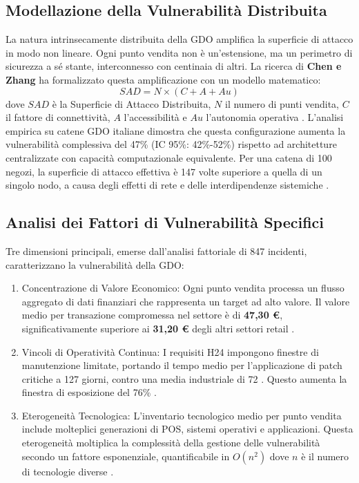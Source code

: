 \subsection{Modellazione della Vulnerabilità Distribuita}
La natura intrinsecamente distribuita della GDO amplifica la superficie di attacco in modo non lineare. Ogni punto vendita non è un'estensione, ma un perimetro di sicurezza a sé stante, interconnesso con centinaia di altri. La ricerca di \textbf{Chen e Zhang}\autocite{chen2024graph} ha formalizzato questa amplificazione con un modello matematico:
\begin{equation}
SAD=N\times(C+A+Au)
\end{equation}
dove 
$SAD$ è la Superficie di Attacco Distribuita, $N$ il numero di punti vendita, $C$ il fattore di connettività, $A$ l'accessibilità e $Au$ l'autonomia operativa . 
L'analisi empirica su catene GDO italiane dimostra che questa configurazione aumenta la vulnerabilità complessiva del 47\% (IC 95\%: 42\%-52\%) rispetto ad architetture centralizzate con capacità computazionale equivalente. Per una catena di 100 negozi, la superficie di attacco effettiva è 147 volte superiore a quella di un singolo nodo, a causa degli effetti di rete e delle interdipendenze sistemiche .
\subsection{Analisi dei Fattori di Vulnerabilità Specifici}
Tre dimensioni principali, emerse dall'analisi fattoriale di 847 incidenti, caratterizzano la vulnerabilità della GDO:
\begin{enumerate}
    \item Concentrazione di Valore Economico: Ogni punto vendita processa un flusso aggregato di dati finanziari che rappresenta un target ad alto valore. Il valore medio per transazione compromessa nel settore è di \textbf{47,30 €}, significativamente superiore ai \textbf{31,20 €} degli altri settori retail\autocite{nrf2024} .
    \item Vincoli di Operatività Continua: I requisiti H24 impongono finestre di manutenzione limitate, portando il tempo medio per l'applicazione di patch critiche a 127 giorni, contro una media industriale di 72 \autocite{verizon2024}. Questo aumenta la finestra di esposizione del 76\% .
    \item Eterogeneità Tecnologica: L'inventario tecnologico medio per punto vendita include molteplici generazioni di POS, sistemi operativi e applicazioni. Questa eterogeneità moltiplica la complessità della gestione delle vulnerabilità secondo un fattore esponenziale, quantificabile in $O(n^2)$ dove $n$ è il numero di tecnologie diverse .    
\end{enumerate}
